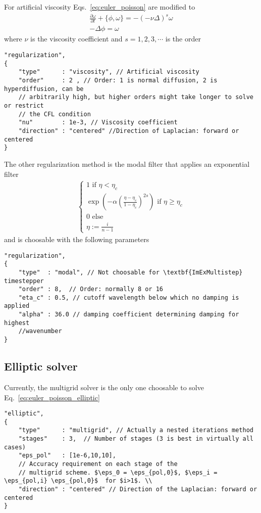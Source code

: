 For artificial viscosity Eqs.~\eqref{eq:euler_poisson} are modified to
\begin{subequations}
\begin{align}
    \frac{\partial \omega}{\partial t} + \{ \phi, \omega\} = -(-\nu \Delta)^s \omega\\
 -\Delta \phi = \omega
\end{align}
\label{eq:euler_poisson_viscous}
\end{subequations}
where $\nu$ is the viscosity coefficient and $s=1,2,3,\cdots$ is the order
\begin{verbatim}
"regularization",
{
    "type"      : "viscosity", // Artificial viscosity
    "order"     : 2 , // Order: 1 is normal diffusion, 2 is hyperdiffusion, can be
    // arbitrarily high, but higher orders might take longer to solve or restrict
    // the CFL condition
    "nu"        : 1e-3, // Viscosity coefficient
    "direction" : "centered" //Direction of Laplacian: forward or centered
}
\end{verbatim}
The other regularization method is the modal filter that applies an exponential filter
\begin{align}
    \begin{cases}
    1 \text{ if } \eta < \eta_c \\
    \exp\left( -\alpha  \left(\frac{\eta-\eta_c}{1-\eta_c} \right)^{2s}\right) \text { if } \eta \geq \eta_c \\
    0 \text{ else} \\
    \eta := \frac{i}{n-1}
    \end{cases}
\end{align}
and is choosable with the following parameters
\begin{verbatim}
"regularization",
{
    "type"  : "modal", // Not choosable for \textbf{ImExMultistep} timestepper
    "order" : 8,  // Order: normally 8 or 16
    "eta_c" : 0.5, // cutoff wavelength below which no damping is applied
    "alpha" : 36.0 // damping coefficient determining damping for highest
    //wavenumber
}
\end{verbatim}
\subsection{Elliptic solver}
Currently, the multigrid solver is the only one choosable
to solve Eq.~\eqref{eq:euler_poisson_elliptic}
\begin{verbatim}
"elliptic",
{
    "type"      : "multigrid", // Actually a nested iterations method
    "stages"    : 3,  // Number of stages (3 is best in virtually all cases)
    "eps_pol"   : [1e-6,10,10],
    // Accuracy requirement on each stage of the
    // multigrid scheme. $\eps_0 = \eps_{pol,0}$, $\eps_i = \eps_{pol,i} \eps_{pol,0}$  for $i>1$. \\
    "direction" : "centered" // Direction of the Laplacian: forward or centered
}
\end{verbatim}
